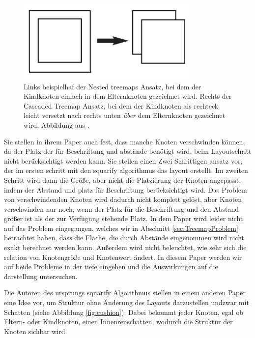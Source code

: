 \begin{figure}
    \centering
    \includegraphics[width=0.8\textwidth]{images/cascaded.png}
    \caption{Links beispielhaf der Nested treemaps Ansatz, bei dem der Kindknoten einfach in dem Elternknoten gezeichnet wird. Rechts der Cascaded Treemap Ansatz, bei dem der Kindknoten als rechteck leicht versetzt nach rechts unten \textit{über} dem Elternknoten gezeichnet wird. Abbildung aus \cite[3]{lu2008cascaded}.}
    \label{fig:cascaded}
\end{figure}

Sie stellen in ihrem Paper auch fest, dass manche Knoten verschwinden können, da der Platz der für Beschriftung und abstände benötigt wird, beim Layoutschritt nicht berücksichtigt werden kann. Sie stellen einen Zwei Schrittigen ansatz vor, der im ersten schritt mit den squarify algorithmus \cite{bruls2000squarified} das layout erstellt. Im zweiten Schritt wird dann die Größe, aber nicht die Platzierung der Knoten angepasst, indem der Abstand und platz für Beschriftung berücksichtigt wird. Das Problem von verschwindenden Knoten wird dadurch nicht komplett gelöst, aber Knoten verschwinden nur noch, wenn der Platz für die Beschriftung und den Abstand größer ist als der zur Verfügung stehende Platz. 
In dem Paper wird leider nicht auf das Problem eingegangen, welches wir in Abschnitt \ref{sec:TreemapProblem} betrachtet haben, dass die Fläche, die durch Abstände eingenommen wird nicht exakt berechnet werden kann. Außerdem wird nicht beleuchtet, wie sehr sich die relation von Knotengröße und Knotenwert ändert. In diesem Paper werden wir auf beide Probleme in der tiefe eingehen und die Auswirkungen auf die darstellung untersuchen.


Die Autoren des ursprungs squarify Algorithmus \cite{bruls2000squarified} stellen in einem anderen Paper \cite{cushionTreemaps} eine Idee vor, um Struktur ohne Änderung des Layouts darzustellen undzwar mit Schatten (siehe Abbildung \ref{fig:cushion}). Dabei bekommt jeder Knoten, egal ob Eltern- oder Kindknoten, einen Innenrenschatten, wodurch die Struktur der Knoten sichbar wird.

